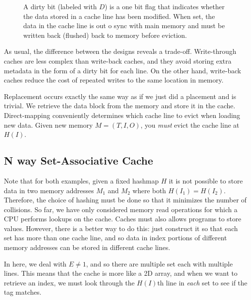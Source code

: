 \begin{definition}
\begin{enumerate}
\begin{figure}[H]
        \caption{A dirty bit (labeled with $D$) is a one bit flag that indicates whether the data stored in a cache line has been modified. When set, the data in the cache line is out o sync with main memory and must be written back (flushed) back to memory before eviction. } 
        \label{fig:dirty_bit}
      \end{figure}
    \end{enumerate}
    As usual, the difference between the designs reveals a trade-off. Write-through caches are less complex than write-back caches, and they avoid storing extra metadata in the form of a dirty bit for each line. On the other hand, write-back caches reduce the cost of repeated writes to the same location in memory.
  \end{definition}

  \begin{theorem}[Replacement]
    \label{thm:replacement}
    Replacement occurs exactly the same way as if we just did a placement and is trivial. We retrieve the data block from the memory and store it in the cache. Direct-mapping conveniently determines which cache line to evict when loading new data. Given new memory $M = (T, I, O)$, you \textit{must} evict the cache line at $H(I)$. 
  \end{theorem}

\subsection{N way Set-Associative Cache}

  Note that for both examples, given a fixed hashmap $H$ it is not possible to store data in two memory addresses $M_1$ and $M_2$ where both $H(I_1) = H(I_2)$. Therefore, the choice of hashing must be done so that it minimizes the number of collisions. So far, we have only considered memory read operations for which a CPU performs lookups on the cache. Caches must also allows programs to store values. However, there is a better way to do this: just construct it so that each set has more than one cache line, and so data in index portions of different memory addresses can be stored in different cache lines.

  In here, we deal with $E \neq 1$, and so there are multiple set each with multiple lines. This means that the cache is more like a 2D array, and when we want to retrieve an index, we must look through the $H(I)$th line in \textit{each} set to see if the tag matches. 

